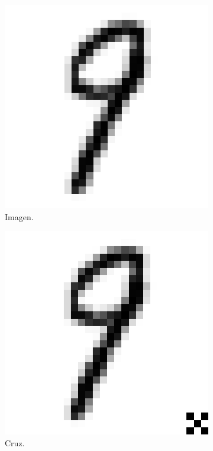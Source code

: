\begin{figure}[h!]
\centering
\begin{subfigure}{.16\linewidth}
  \centering
  \includegraphics[width=0.8\linewidth]{figuras/backdoor/emnist.png}
  \caption{Imagen.}
\end{subfigure}
\begin{subfigure}{.16\linewidth}
  \centering
  \includegraphics[width=0.8\linewidth]{figuras/backdoor/emnist_cross.png}
  \caption{Cruz.}
\end{subfigure}
\begin{subfigure}{.16\linewidth}

\end{subfigure}
\end{figure}
